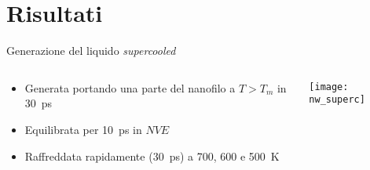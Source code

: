 \documentclass{beamer}
\begin{document}
\section{Risultati}


\begin{frame}{Generazione del liquido \emph{supercooled}}
 \begin{columns}
  \begin{column}{0.5\textwidth}
   \begin{itemize}
    \item Generata portando una parte del nanofilo a $T > T_m$ in \SI{30}{ps}
    \item Equilibrata per \SI{10}{ps} in $NVE$
    \item Raffreddata rapidamente (\SI{30}{ps}) a \num{700}, \num{600} e \SI{500}{K}
   \end{itemize}

  \end{column}
  \begin{column}{0.5\textwidth}
   \texttt{[image: nw\_superc]}
  \end{column}
 \end{columns}
\end{frame}
\end{document}
